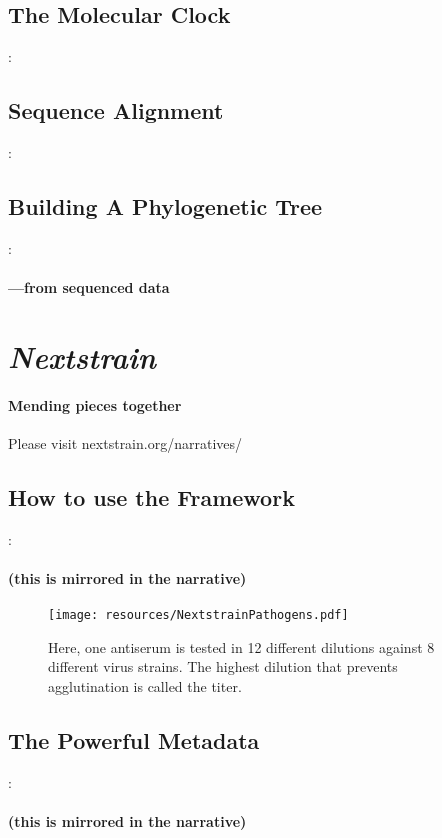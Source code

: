 \documentclass{beamer}
\begin{document}
\begin{darkframes}
    \subsection{The Molecular Clock}
    \begin{frame}{\secname : \subsecname}
      \framesubtitle{}
    \end{frame}

    \subsection{Sequence Alignment}
    \begin{frame}{\secname : \subsecname}
      \framesubtitle{}
    \end{frame}

    \subsection{Building A Phylogenetic Tree}
    \begin{frame}{\secname : \subsecname}
      \framesubtitle{---from sequenced data}
    \end{frame}

  \section{\textit{Nextstrain}}

    \begin{frame}{\secname}
      \framesubtitle{Mending pieces together}
      Please visit nextstrain.org/narratives/
    \end{frame}

    \subsection{How to use the Framework}
    \begin{frame}{\secname : \subsecname}
      \framesubtitle{(this is mirrored in the narrative)}
      \begin{figure}
        \texttt{[image: resources/NextstrainPathogens.pdf]}
        \caption{\footnotesize Here, one antiserum is tested in 12 different dilutions against 8 different virus strains. The highest dilution that prevents agglutination is called the titer.}
      \end{figure}
    \end{frame}

    \subsection{The Powerful Metadata}
    \begin{frame}{\secname : \subsecname}
      \framesubtitle{(this is mirrored in the narrative)}
    \end{frame}


\end{darkframes}
\end{document}
